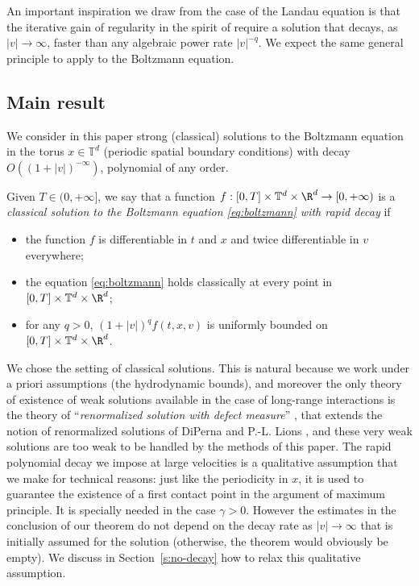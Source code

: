 An important inspiration we draw from the case of the Landau equation
is that the iterative gain of regularity in the spirit of
\cite{henderson2017c} require a solution that decays, as
$|v| \to \infty$, faster than any algebraic power rate $|v|^{-q}$. We
expect the same general principle to apply to the Boltzmann
equation.

\subsection{Main result}

We consider in this paper strong (classical) solutions to the
Boltzmann equation in the torus $x \in \mathbb T^d$ (periodic spatial
boundary conditions) with decay $O((1+|v|)^{-\infty})$,
\ie polynomial of any order.

\begin{defn} \label{d:solutions-rapid-decay} Given $T \in (0,+\infty]$, we
say that a function
$f : [0,T] \times \mathbb T^d \times \R^d \to [0,+\infty)$ is a
\emph{classical solution to the Boltzmann equation
\eqref{eq:boltzmann} with rapid decay} if
\begin{itemize}
\item the function $f$ is differentiable in $t$ and $x$ and twice
differentiable in $v$ everywhere;
\item the equation \eqref{eq:boltzmann} holds classically at every
point in $[0,T] \times \mathbb T^d \times \R^d$;
\item for any $q>0$, $(1+|v|)^q f(t,x,v)$ is uniformly bounded on
$[0,T] \times \mathbb T^d \times \R^d$.
\end{itemize}
\end{defn}

We chose the setting of classical solutions. This is natural because
we work under a priori assumptions (the hydrodynamic bounds),
and moreover the only theory of existence of weak solutions available
in the case of long-range interactions is the theory of
``\emph{renormalized solution with defect measure}'' \cite{MR1857879},
that extends the notion of renormalized solutions of DiPerna and
P.-L. Lions \cite{MR1014927}, and these very weak solutions are too
weak to be handled by the methods of this paper. The rapid polynomial
decay we impose at large velocities is a qualitative assumption that
we make for technical reasons: just like the periodicity in $x$, it is
used to guarantee the existence of a first contact point in the
argument of maximum principle. It is specially needed in the case
$\gamma >0$. However the estimates in the conclusion of our theorem do
not depend on the decay rate as $|v| \to \infty$ that is initially
assumed for the solution (otherwise, the theorem would obviously be
empty). We discuss in Section~\ref{s:no-decay} how to relax this
qualitative assumption.


